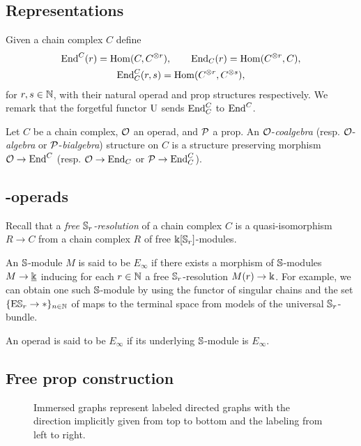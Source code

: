\subsection{Representations}

Given a chain complex $C$ define
\begin{gather*}
\End^C(r) = \Hom(C, C^{\otimes r}), \qquad
\End_C(r) = \Hom(C^{\otimes r}, C), \\
\End^C_C(r, s) = \Hom(C^{\otimes r}, C^{\otimes s}),
\end{gather*}
for $r,s \in \N$, with their natural operad and prop structures respectively.
We remark that the forgetful functor $\forget$ sends $\End^C_C$ to $\End^C$.

Let $C$ be a chain complex, $\cO$ an operad, and $\cP$ a prop.
An $\cO$-\textit{coalgebra} (resp. $\cO$-\textit{algebra} or $\cP$-\textit{bialgebra}) structure on $C$ is a structure preserving morphism $\cO \to \End^C$ (resp. $\cO \to \End_C$ or $\cP \to \End_C^C$).

\subsection{\pdfEinfty-operads}

Recall that a \textit{free $\S_r$-resolution} of a chain complex $C$ is a quasi-isomorphism $R \to C$ from a chain complex $R$ of free $\k[\S_r]$-modules.

An $\S$-module $M$ is said to be $E_\infty$ if there exists a morphism of $\S$-modules $M \to \underline{\k}$ inducing for each $r \in \N$ a free $\S_r$-resolution $M(r) \to \k$.
For example, we can obtain one such $\S$-module by using the functor of singular chains and the set $\{\mathrm{E} \S_r \to \ast\}_{n \in \N}$ of maps to the terminal space from models of the universal $\S_r$-bundle.

An operad is said to be $E_\infty$ if its underlying $\S$-module is $E_\infty$.

\subsection{Free prop construction} \label{ss:free prop}

\begin{figure}
	
	\caption{Immersed graphs represent labeled directed graphs with the direction implicitly given from top to bottom and the labeling from left to right.}
	\label{f:immersion}
\end{figure}

